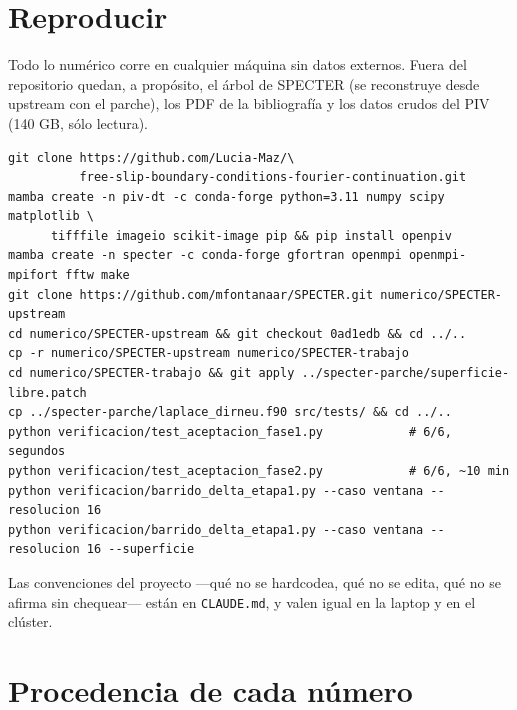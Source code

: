\documentclass[11pt,a4paper]{article}
\begin{document}
\appendix

\section{Reproducir}

Todo lo numérico corre en cualquier máquina sin datos externos. Fuera del repositorio
quedan, a propósito, el árbol de SPECTER (se reconstruye desde upstream con el parche),
los PDF de la bibliografía y los datos crudos del PIV (140 GB, sólo lectura).
{\small\begin{verbatim}
git clone https://github.com/Lucia-Maz/\
          free-slip-boundary-conditions-fourier-continuation.git
mamba create -n piv-dt -c conda-forge python=3.11 numpy scipy matplotlib \
      tifffile imageio scikit-image pip && pip install openpiv
mamba create -n specter -c conda-forge gfortran openmpi openmpi-mpifort fftw make
git clone https://github.com/mfontanaar/SPECTER.git numerico/SPECTER-upstream
cd numerico/SPECTER-upstream && git checkout 0ad1edb && cd ../..
cp -r numerico/SPECTER-upstream numerico/SPECTER-trabajo
cd numerico/SPECTER-trabajo && git apply ../specter-parche/superficie-libre.patch
cp ../specter-parche/laplace_dirneu.f90 src/tests/ && cd ../..
python verificacion/test_aceptacion_fase1.py            # 6/6, segundos
python verificacion/test_aceptacion_fase2.py            # 6/6, ~10 min
python verificacion/barrido_delta_etapa1.py --caso ventana --resolucion 16
python verificacion/barrido_delta_etapa1.py --caso ventana --resolucion 16 --superficie
\end{verbatim}}
Las convenciones del proyecto ---qué no se hardcodea, qué no se edita, qué no se afirma
sin chequear--- están en \texttt{CLAUDE.md}, y valen igual en la laptop y en el clúster.

\section{Procedencia de cada número}
\end{document}
